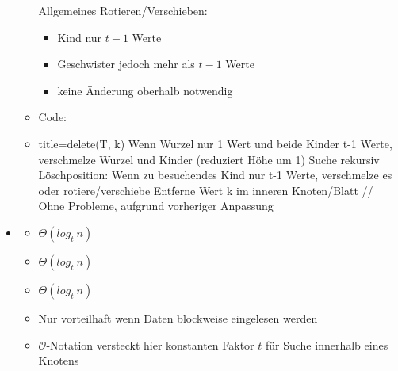 \documentclass[
    12pt,
    a4paper,
    ngerman,
    color=3b,%
    marginpar=false,
    colorback=false,
    leqno,
]{tudaexercise}
\begin{document}
\begin{itemize}
\begin{itemize}
\begin{minipage}{0.25\textwidth}
                    \end{minipage}
                    \begin{minipage}{0.65\textwidth}
                        Allgemeines Rotieren/Verschieben:
                        \begin{itemize}
                            \item Kind nur $t-1$ Werte
                            \item Geschwister jedoch mehr als $t-1$ Werte
                            \item keine Änderung oberhalb notwendig
                        \end{itemize}
                    \end{minipage}
                    
                    \item Code:
                \item[]
                    \begin{ccode}[autogobble]{title={delete(T, k)}}
                    Wenn Wurzel nur 1 Wert und beide Kinder t-1 Werte, 
                    verschmelze Wurzel und Kinder (reduziert Höhe um 1)
                    Suche rekursiv Löschposition:
                        Wenn zu besuchendes Kind nur t-1 Werte, 
                        verschmelze es oder rotiere/verschiebe
                    Entferne Wert k im inneren Knoten/Blatt             
                    // Ohne Probleme, aufgrund vorheriger Anpassung
                    \end{ccode}
            \end{itemize}

        \item {}
            \begin{itemize}
                \item {} $\Theta(log_t~n)$
                \item {} $\Theta(log_t~n)$
                \item {} $\Theta(log_t~n)$
                \item Nur vorteilhaft wenn Daten blockweise eingelesen werden
                \item $\mathcal{O}$-Notation versteckt hier konstanten Faktor $t$ für Suche innerhalb eines Knotens
            \end{itemize}
    \end{itemize}
    \clearpage
\end{document}
